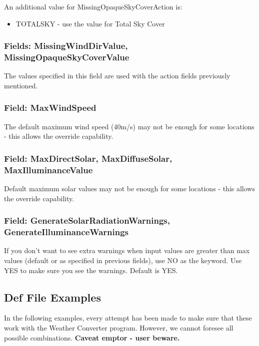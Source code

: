 An additional value for MissingOpaqueSkyCoverAction is:

\begin{itemize}
\tightlist
\item
  TOTALSKY - use the value for Total Sky Cover
\end{itemize}

\subsubsection{Fields: MissingWindDirValue, MissingOpaqueSkyCoverValue}\label{fields-missingwinddirvalue-missingopaqueskycovervalue}

The values specified in this field are used with the action fields previously mentioned.

\subsubsection{Field: MaxWindSpeed}\label{field-maxwindspeed}

The default maximum wind speed (40m/s) may not be enough for some locations - this allows the override capability.

\subsubsection{Field: MaxDirectSolar, MaxDiffuseSolar, MaxIlluminanceValue}\label{field-maxdirectsolar-maxdiffusesolar-maxilluminancevalue}

Default maximum solar values may not be enough for some locations - this allows the override capability.

\subsubsection{Field: GenerateSolarRadiationWarnings, GenerateIlluminanceWarnings}\label{field-generatesolarradiationwarnings-generateilluminancewarnings}

If you don't want to see extra warnings when input values are greater than max values (default or as specified in previous fields), use NO as the keyword. Use YES to make sure you see the warnings. Default is YES.

\subsection{Def File Examples}\label{def-file-examples}

In the following examples, every attempt has been made to make sure that these work with the Weather Converter program. However, we cannot foresee all possible combinations. \textbf{Caveat emptor - user beware.}

